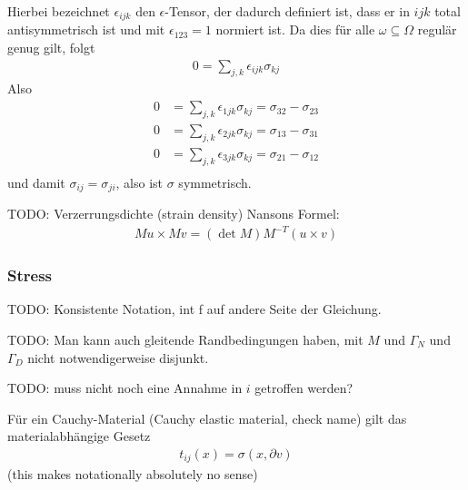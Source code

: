 \documentclass{scrartcl}
\begin{document}
Hierbei bezeichnet $\epsilon_{ijk}$ den $\epsilon$-Tensor, der dadurch definiert ist, dass er in $ijk$ total antisymmetrisch ist und mit $\epsilon_{123}=1$ normiert ist. Da dies für alle $\omega\subseteq\Omega$ regulär genug gilt, folgt
\begin{align*}
	0=\sum_{j,k}\epsilon_{ijk}\sigma_{kj}
\end{align*}
Also
\begin{align*}
	0 &= \sum_{j,k}\epsilon_{1jk}\sigma_{kj} = \sigma_{32}-\sigma_{23} \\
	0 &= \sum_{j,k}\epsilon_{2jk}\sigma_{kj} = \sigma_{13}-\sigma_{31} \\
	0 &= \sum_{j,k}\epsilon_{3jk}\sigma_{kj} = \sigma_{21}-\sigma_{12} \\
\end{align*}
und damit $\sigma_{ij}=\sigma_{ji}$, also ist $\sigma$ symmetrisch.

TODO:
Verzerrungsdichte (strain density)
Nansons Formel:
\begin{align*}
	Mu\times Mv=(\det M)M^{-T}(u\times v)
\end{align*}

\subsubsection*{Stress}

TODO: Konsistente Notation, int f auf andere Seite der Gleichung.

TODO: Man kann auch gleitende Randbedingungen haben, mit $M$ und $\Gamma_N$ und $\Gamma_D$ nicht notwendigerweise disjunkt.

TODO: muss nicht noch eine Annahme in $i$ getroffen werden?


Für ein Cauchy-Material (Cauchy elastic material, check name) gilt das materialabhängige Gesetz
\begin{align*}
	t_{ij}(x) = \sigma(x,\partial v)
\end{align*}
(this makes notationally absolutely no sense)
\end{document}
